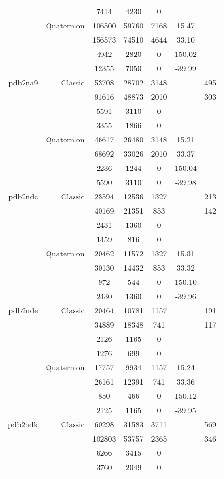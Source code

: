 \begin{xltabular}{\textwidth}{r|rcccSc}
& & 7414 & 4230 & 0 & & \\
& Quaternion & 106500 & 59760 & 7168 & 15.47 & \\
& & 156573 & 74510 & 4644 & 33.10 & \\
& & 4942 & 2820 & 0 & 150.02 & \\
& & 12355 & 7050 & 0 & -39.99 & \\ \addlinespace
pdb2na9 & Classic & 53708 & 28702 & 3148 & & 495 \\
& & 91616 & 48873 & 2010 & & 303 \\
& & 5591 & 3110 & 0 & & \\
& & 3355 & 1866 & 0 & & \\
& Quaternion & 46617 & 26480 & 3148 & 15.21 & \\
& & 68692 & 33026 & 2010 & 33.37 & \\
& & 2236 & 1244 & 0 & 150.04 & \\
& & 5590 & 3110 & 0 & -39.98 & \\ \addlinespace
pdb2ndc & Classic & 23594 & 12536 & 1327 & & 213 \\
& & 40169 & 21351 & 853 & & 142 \\
& & 2431 & 1360 & 0 & & \\
& & 1459 & 816 & 0 & & \\
& Quaternion & 20462 & 11572 & 1327 & 15.31 & \\
& & 30130 & 14432 & 853 & 33.32 & \\
& & 972 & 544 & 0 & 150.10 & \\
& & 2430 & 1360 & 0 & -39.96 & \\ \addlinespace
pdb2nde & Classic & 20464 & 10781 & 1157 & & 191 \\
& & 34889 & 18348 & 741 & & 117 \\
& & 2126 & 1165 & 0 & & \\
& & 1276 & 699 & 0 & & \\
& Quaternion & 17757 & 9934 & 1157 & 15.24 & \\
& & 26161 & 12391 & 741 & 33.36 & \\
& & 850 & 466 & 0 & 150.12 & \\
& & 2125 & 1165 & 0 & -39.95 & \\ \addlinespace
pdb2ndk & Classic & 60298 & 31583 & 3711 & & 569 \\
& & 102803 & 53757 & 2365 & & 346 \\
& & 6266 & 3415 & 0 & & \\
& & 3760 & 2049 & 0 & & \\

\end{xltabular}
